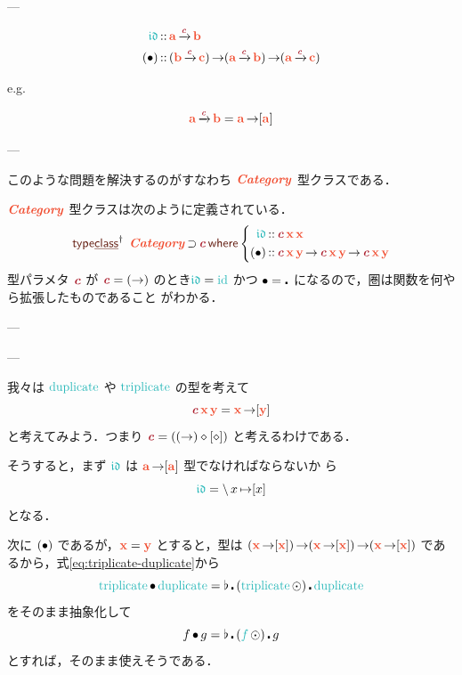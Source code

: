 \documentclass[a5paper,twoside,fleqn,draft]{jsbook}
\begin{document}
---

\begin{align}
  \mIdCat
  &\mIn{}\mA\mCatArrowC\mB\\
  (\mCompCat)
  &\mIn{}(\mB\mCatArrowC\mC)
  \mFuncArrow(\mA\mCatArrowC\mB)
  \mFuncArrow(\mA\mCatArrowC\mC)
\end{align}

e.g.

\begin{equation}
  \mA\mCatArrowC\mB
  =\mA\mFuncArrow[\mA]
\end{equation}

---


このような問題を解決するのがすなわち
$\mCatTypeClass$ 型クラスである．

$\mCatTypeClass$ 型クラスは次のように定義されている．
\begin{equation}
  \mTypeClassDeclPolymorphic\;
  \mCatTypeClass\mSuperSet\mTypeConstructor{c}
  \mWhere\left\{
  \begin{aligned}
    \mIdCat&\mIn\mTypeConstructor{c}\,\mX\,\mX\\
    (\mCompCat)
    &\mIn\mTypeConstructor{c}\,\mX\,\mY
    \mFuncArrow\mTypeConstructor{c}\,\mX\,\mY
    \mFuncArrow\mTypeConstructor{c}\,\mX\,\mY
  \end{aligned}
  \right.
\end{equation}
型パラメタ $\mTypeConstructor{c}$ が
$\mTypeConstructor{c}=(\mFuncArrow)$ のとき$\mIdCat=\mId$ かつ
$\operatorname{\bullet}=\operatorname{\centerdot}$ になるので，圏は関数を何やら拡張したものであること
がわかる．

---

---

我々は $\mDuplicate$ や $\mTriplicate$ の型を考えて
\begin{equation}
  \mTypeConstructor{c}\,\mX\,\mY
  =\mX\mFuncArrow[\mY]
\end{equation}
と考えてみよう．つまり
$\mTypeConstructor{c}=((\mFuncArrow)\hAnonParam[\hAnonParam])$
と考えるわけである．

そうすると，まず $\mIdCat$ は $\mA\mFuncArrow[\mA]$ 型でなければならないか
ら
\begin{equation}
  \label{eq:id-category}
  \mIdCat
  =\mLambda x\mLambdaArrow[x]
\end{equation}
となる．

次に $(\operatorname{\bullet})$ であるが，$\mX=\mY$ とすると，型は
$(\mX\mFuncArrow[\mX])\mFuncArrow(\mX\mFuncArrow[\mX])\mFuncArrow(\mX\mFuncArrow[\mX])$
であるから，式\eqref{eq:triplicate-duplicate}から
\begin{equation}
  \mTriplicate\mCompCat\mDuplicate
  =\mJoinList\hCompose{}(\mTriplicate\mMapList)\hCompose\mDuplicate
\end{equation}
をそのまま抽象化して
\begin{equation}
  \label{eq:triplicate-duplicate-comp}
  f\mCompCat g=\mJoinList\hCompose{}(\hFunc{f}\mMapList)\hCompose g
\end{equation}
とすれば，そのまま使えそうである．
\end{document}
